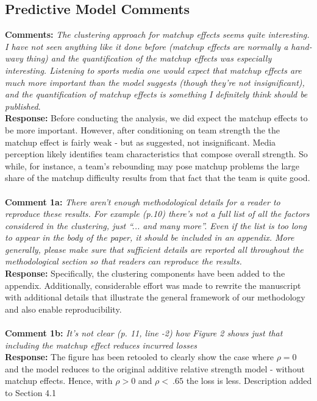 \documentclass[11pt]{article} %
\begin{document}
\subsection*{Predictive Model Comments}
{\bf Comments:}  \emph{The clustering approach for matchup effects seems quite interesting. I have not seen anything like it done before (matchup effects are normally a hand-wavy thing) and the quantification of the matchup effects was especially interesting. Listening to sports media one would expect that matchup effects are much more important than the model suggests (though they're not insignificant), and the quantification of matchup effects is something I definitely think should be published}. \\
{\bf Response:} Before conducting the analysis, we did expect the matchup effects to be more important. However, after conditioning on team strength the the matchup effect is fairly weak - but as suggested, not insignificant. Media perception likely identifies team characteristics that compose overall strength. So while, for instance, a team's rebounding may pose matchup problems the large share of the matchup difficulty results from that fact that the team is quite good. \\
\\
{\bf Comment 1a:}  \emph{There aren't enough methodological details for a reader to reproduce these results. For example (p.10) there's not a full list of all the factors considered in the clustering, just ``... and many more''. Even if the list is too long to appear in the body of the paper, it should be included in an appendix. More generally, please make sure that sufficient details are reported all throughout the methodological section so that readers can reproduce the results.} \\
{\bf Response:} Specifically, the clustering components have been added to the appendix. Additionally, considerable effort was made to rewrite the manuscript with additional details that illustrate the general framework of our methodology and also enable reproducibility. \\
\\
{\bf Comment 1b:}  \emph{It's not clear (p. 11, line -2) how Figure 2 shows just that including the matchup effect reduces incurred losses} \\
{\bf Response:} The figure has been retooled to clearly show the case where $\rho=0$ and the model reduces to the original additive relative strength model - without matchup effects. Hence, with $\rho > 0$ and $\rho < ~.65$ the loss is less. Description added to Section 4.1\\
\end{document}
